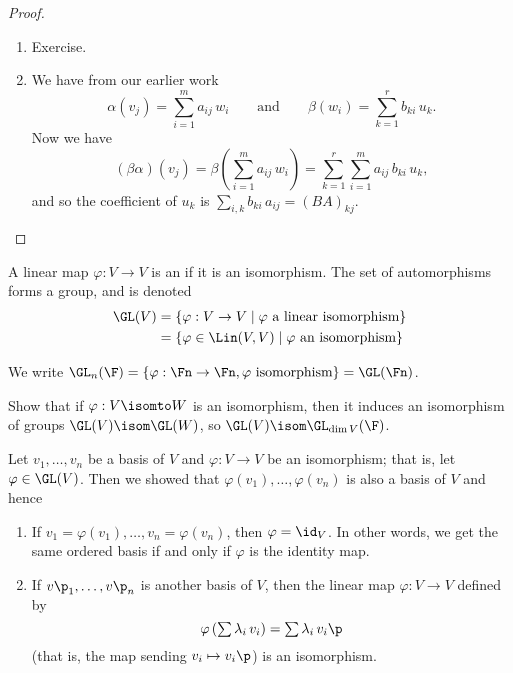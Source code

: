 \begin{proof}
	\mbox{}
	\begin{enumerate}
		\shortskip
		\item Exercise.
		\item We have from our earlier work
		\begin{equation*}
			\alpha(v_{j}) = \sum_{i=1}^m a_{ij} \,w_i
			\qquad \text{and} \qquad
			\beta(w_i) = \sum_{k=1}^r b_{ki} \,u_k.
		\end{equation*}
		Now we have
		\begin{equation*}
			(\beta\alpha)(v_{j})
			= \beta\left( \sum_{i=1}^m a_{ij} \,w_i \right)
			= \sum_{k=1}^r \sum_{i=1}^m a_{ij} \, b_{ki} \,u_k,
		\end{equation*}
		and so the coefficient of $u_k$ is $\sum_{i,k} b_{ki} \,a_{ij} = \left( BA \right)_{kj}$. \qedhere %
	\end{enumerate} %
\end{proof}

\begin{definition}
	A linear map $\varphi:V\to V$ is an  if it is an isomorphism. The set of automorphisms forms a group, and is denoted %
	\begin{align*}
		\GL(V)
		&= \left\{\varphi:V\to V \mid \varphi \text{ a linear isomorphism}\right\} \\ %
		&= \left\{\varphi\in \Lin(V,V) \mid \varphi \text{ an isomorphism}\right\}
	\end{align*}
\end{definition}

\begin{example}
	We write $\GL_n(\F) = \left\{\varphi:\Fn\to\Fn, \varphi \text{ isomorphism}\right\} = \GL(\Fn)$. %
\end{example}

\begin{exercise}
	Show that if $\varphi:V\isomto W$ is an isomorphism, then it induces an isomorphism of groups $\GL(V) \isom \GL(W)$, so $\GL(V) \isom \GL_{\dim V}(\F)$. 
\end{exercise}

\begin{lemma}
	Let $v_1,\ldots,v_n$ be a basis of $V$ and $\varphi:V\to V$ be %
	an isomorphism; that is, let $\varphi\in\GL(V)$. Then we showed that $\varphi(v_1),\ldots,\varphi(v_n)$ is also a basis of $V$ and hence %
	\begin{enumerate}
		\shortskip
		\item If $v_1=\varphi(v_1),\ldots,v_n=\varphi(v_n)$, then $\varphi = \id_V$.  In other words, we get the same ordered basis if and only if $\varphi$ is the identity map. %
		\item If $v\p_1,\ldots,v\p_n$ is another basis of $V$, then the linear map $\varphi:V\to V$ defined by %
		\begin{equation*}
			\textstyle\varphi\left( \sum \lambda_i \,v_i \right) = \sum \lambda_i \,v_i\p %
		\end{equation*}
		(that is, the map sending $v_i \mapsto v_i\p$) is an isomorphism.
	\end{enumerate}
\end{lemma}

